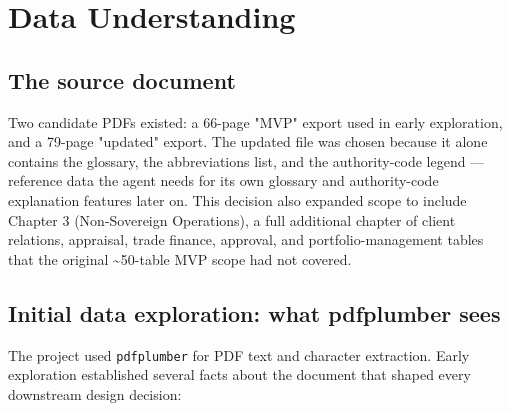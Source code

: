 \chapter{Data Understanding}
\label{ch:data-understanding}
\section{The source document}
Two candidate PDFs existed: a 66-page "MVP" export used in early exploration, and a 79-page "updated" export. The updated file was chosen because it alone contains the glossary, the abbreviations list, and the authority-code legend — reference data the agent needs for its own glossary and authority-code explanation features later on. This decision also expanded scope to include Chapter 3 (Non-Sovereign Operations), a full additional chapter of client relations, appraisal, trade finance, approval, and portfolio-management tables that the original \textasciitilde{}50-table MVP scope had not covered.

\section{Initial data exploration: what pdfplumber sees}
The project used \texttt{pdfplumber} for PDF text and character extraction. Early exploration established several facts about the document that shaped every downstream design decision:

